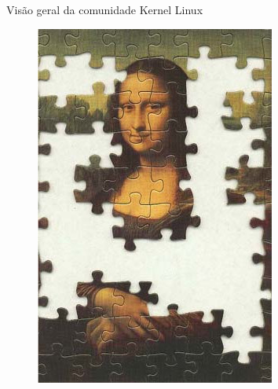 \documentclass[10pt, compress, aspectratio=169]{beamer}
\begin{document}
\begin{frame}{Visão geral da comunidade Kernel Linux}
  \begin{figure}
    \centering
    \includegraphics[width=\linewidth,
                     height=0.8\textheight,
                     keepaspectratio]{monalisa_puzzle}
  \end{figure}
\end{frame}
\end{document}
